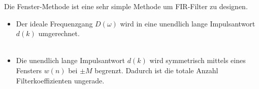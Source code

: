 % 
% 
% 
% 
%


Die Fenster-Methode ist eine sehr simple Methode um FIR-Filter zu designen.
\begin{itemize}
 \item Der ideale Frequenzgang $D(\omega)$ wird in eine unendlich lange Impulsantwort $d(k)$ umgerechnet.\\[0.2cm]
 \\[-1.65cm]
\end{itemize}
\begin{minipage}{0.7\textwidth}
	\begin{itemize}
	 \item Die unendlich lange Impulsantwort $d(k)$ wird symmetrisch mittels eines Fensters $w(n)$ bei $\pm M$ begrenzt. Dadurch ist die totale Anzahl Filterkoeffizienten ungerade. $\qquad$
	 \\[0.2cm]
	\end{itemize}
\end{minipage}
\begin{minipage}{0.02\textwidth}$ $\end{minipage}
